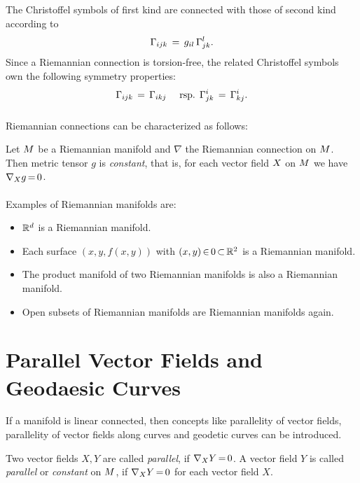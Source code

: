 \documentclass[11pt,twoside]{article}
\begin{document}
\subparagraph{}
The Christoffel symbols of first kind are connected with those of second kind
according to
\[
\Gamma_{ijk} \= g_{il} \, \Gamma^l_{jk}.
\]
Since a Riemannian connection is torsion-free,
the related Christoffel symbols own the following symmetry properties:
\[
\Gamma_{ijk}  \= \Gamma_{ikj} \quad \mbox{ rsp. }
\Gamma^i_{jk} \= \Gamma^i_{kj}.
\]

\subparagraph{}
Riemannian connections can be characterized as follows:

\begin{theorem}
Let $\difM$ be a Riemannian manifold
and $\nabla$ the Riemannian connection on $\difM$.
Then metric tensor $g$ is \textit{constant},
that is,
for each vector field $\vecX$ on $\difM$ we have $\nabla_{\vecX} g \eq 0$.
\end{theorem}

\paragraph{}
Examples of Riemannian manifolds are:

\begin{itemize}[leftmargin=15pt]
\item[1.]
$\R^d$ is a Riemannian manifold.
\item[2.]
Each surface $(x,y,f(x,y))$ with $(x,y) \xeof 0 \xsubset \R^2$
is a Riemannian manifold.
\item[3.]
The product manifold of two Riemannian manifolds
is also a Riemannian manifold.
\item[4.]
Open subsets of Riemannian manifolds are Riemannian manifolds again.
\end{itemize}

\section{Parallel Vector Fields and Geodaesic Curves}
If a manifold is linear connected,
then concepts like
parallelity of vector fields, parallelity of vector fields
along curves and geodetic curves can be introduced.

\begin{definition}
Two vector fields $X,Y$ are called \textit{parallel}, if $\nabla_X Y \eq 0$.
A vector field $Y$ is called \textit{parallel} or \textit{constant} on $\difM$,
if $\nabla_X Y \eq 0$ for each vector field $X$.
\end{definition}
\end{document}

